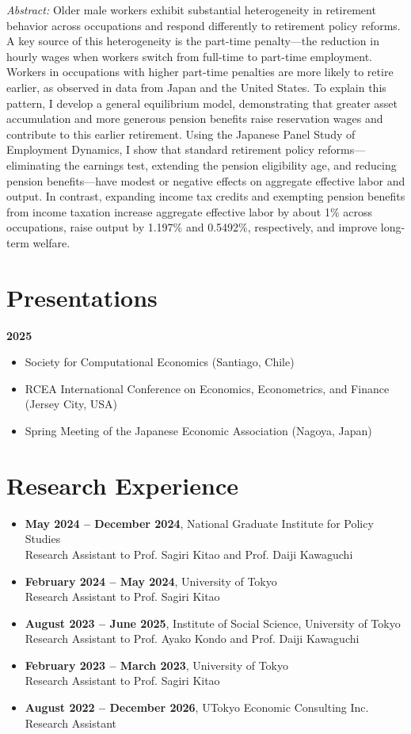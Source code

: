 \documentclass[11pt]{article}
\begin{document}
\textit{Abstract:} Older male workers exhibit substantial heterogeneity in retirement behavior across occupations and respond differently to retirement policy reforms. A key source of this heterogeneity is the part-time penalty—the reduction in hourly wages when workers switch from full-time to part-time employment. Workers in occupations with higher part-time penalties are more likely to retire earlier, as observed in data from Japan and the United States. To explain this pattern, I develop a general equilibrium model, demonstrating that greater asset accumulation and more generous pension benefits raise reservation wages and contribute to this earlier retirement. Using the Japanese Panel Study of Employment Dynamics, I show that standard retirement policy reforms—eliminating the earnings test, extending the pension eligibility age, and reducing pension benefits—have modest or negative effects on aggregate effective labor and output. In contrast, expanding income tax credits and exempting pension benefits from income taxation increase aggregate effective labor by about 1\% across occupations, raise output by 1.197\% and 0.5492\%, respectively, and improve long-term welfare.
\section*{Presentations}

\textbf{2025}
\begin{itemize}[leftmargin=1.5em]
   \item Society for Computational Economics (Santiago, Chile)
   \item RCEA International Conference on Economics, Econometrics, and Finance (Jersey City, USA)
   \item Spring Meeting of the Japanese Economic Association (Nagoya, Japan)
\end{itemize}

\section*{Research Experience}
\begin{itemize}[leftmargin=1.5em]
  \item \textbf{May 2024 -- December 2024}, National Graduate Institute for Policy Studies \\
  Research Assistant to Prof. Sagiri Kitao and Prof. Daiji Kawaguchi
  \item \textbf{February 2024 -- May 2024}, University of Tokyo \\
  Research Assistant to Prof. Sagiri Kitao
  \item \textbf{August 2023 -- June 2025}, Institute of Social Science, University of Tokyo \\
  Research Assistant to Prof. Ayako Kondo and Prof. Daiji Kawaguchi
  \item \textbf{February 2023 -- March 2023}, University of Tokyo \\
  Research Assistant to Prof. Sagiri Kitao
  \item \textbf{August 2022 -- December 2026}, UTokyo Economic Consulting Inc. \\
  Research Assistant
\end{itemize}
\end{document}
